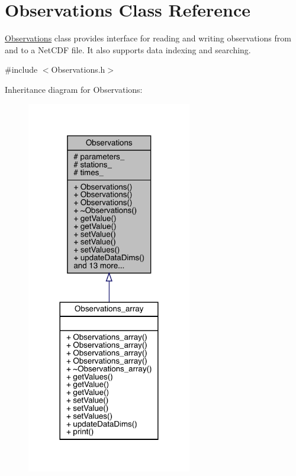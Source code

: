 \hypertarget{class_observations}{}\section{Observations Class Reference}
\label{class_observations}


\mbox{\hyperlink{class_observations}{Observations}} class provides interface for reading and writing observations from and to a Net\+C\+DF file. It also supports data indexing and searching.  




{\ttfamily \#include $<$Observations.\+h$>$}



Inheritance diagram for Observations\+:\nopagebreak
\begin{figure}[H]
\begin{center}
\leavevmode
\includegraphics[width=204pt]{class_observations__inherit__graph}
\end{center}
\end{figure}


